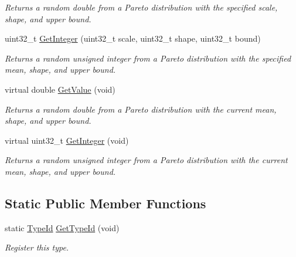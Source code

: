 \begin{DoxyCompactItemize}
\begin{DoxyCompactList}\small\item\em Returns a random double from a Pareto distribution with the specified scale, shape, and upper bound. \end{DoxyCompactList}\item 
uint32\+\_\+t \hyperlink{classns3_1_1ParetoRandomVariable_a3c5f13921075d1fcb0caea45eac624fe}{Get\+Integer} (uint32\+\_\+t scale, uint32\+\_\+t shape, uint32\+\_\+t bound)
\begin{DoxyCompactList}\small\item\em Returns a random unsigned integer from a Pareto distribution with the specified mean, shape, and upper bound. \end{DoxyCompactList}\item 
virtual double \hyperlink{classns3_1_1ParetoRandomVariable_af5588dd7354a1de1a3926fbf8c6edd74}{Get\+Value} (void)
\begin{DoxyCompactList}\small\item\em Returns a random double from a Pareto distribution with the current mean, shape, and upper bound. \end{DoxyCompactList}\item 
virtual uint32\+\_\+t \hyperlink{classns3_1_1ParetoRandomVariable_a5606df53e01a0254b5bfb3af14929acc}{Get\+Integer} (void)
\begin{DoxyCompactList}\small\item\em Returns a random unsigned integer from a Pareto distribution with the current mean, shape, and upper bound. \end{DoxyCompactList}\end{DoxyCompactItemize}
\subsection*{Static Public Member Functions}
\begin{DoxyCompactItemize}
\item 
static \hyperlink{classns3_1_1TypeId}{Type\+Id} \hyperlink{classns3_1_1ParetoRandomVariable_a67aef9aab600df6b3f42a07b75b83dc2}{Get\+Type\+Id} (void)
\begin{DoxyCompactList}\small\item\em Register this type. \end{DoxyCompactList}\end{DoxyCompactItemize}
